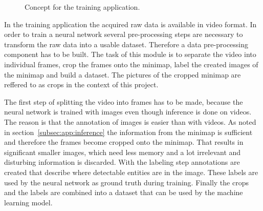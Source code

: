 \begin{figure}
	\caption{Concept for the training application.}
	\label{fig:app:conceptTrain}
\end{figure}

In the training application the acquired raw data is available in video format. In order to train a neural 
network several pre-processing steps are necessary to transform the raw data into a usable dataset. 
Therefore a data pre-processing component has to be built. The task of this module is to separate 
the video into individual frames, crop the frames onto the minimap, label the created images of the 
minimap and build a dataset. The pictures of the cropped minimap are reffered to as crops in the 
context of this project.

The first step of splitting the video into frames has to be made, because the neural network is 
trained with images even though inference is done on videos. The reason is that the annotation of 
images is easier than with videos. As noted in section~\ref{subsec:app:inference} the information 
from the minimap is sufficient and therefore the frames become cropped onto the minimap. That 
results in significant smaller images, which need less memory and a lot irrelevant and disturbing 
information is discarded. With the labeling step annotations are created that describe where 
detectable entities are in the image. These labels are used by the neural network as ground truth 
during training. Finally the crops and the labels are combined into a dataset that can be used by the 
machine learning model.

